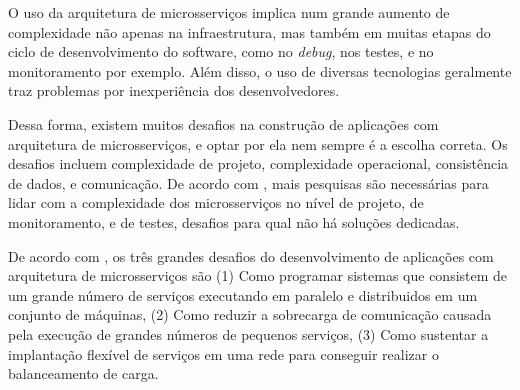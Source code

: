 O uso da arquitetura de microsserviços implica num grande aumento de complexidade não apenas na infraestrutura, mas também em muitas etapas do ciclo de desenvolvimento do software, como no \emph{debug}, nos testes, e no monitoramento por exemplo. Além disso, o uso de diversas tecnologias geralmente traz problemas por inexperiência dos desenvolvedores. 

Dessa forma, existem muitos desafios na construção de aplicações com arquitetura de microsserviços, e optar por ela nem sempre é a escolha correta. Os desafios incluem complexidade de projeto, complexidade operacional, consistência de dados, e comunicação. De acordo com , mais pesquisas são necessárias para lidar com a complexidade dos microsserviços no nível de projeto, de monitoramento, e de testes, desafios para qual não há soluções dedicadas.

De acordo com , os três grandes desafios do desenvolvimento de aplicações com arquitetura de microsserviços são (1) Como programar sistemas que consistem de um grande número de serviços executando em paralelo e distribuidos em um conjunto de máquinas, (2) Como reduzir a sobrecarga de comunicação causada pela execução de grandes números de pequenos serviços, (3) Como sustentar a implantação flexível de serviços em uma rede para conseguir realizar o balanceamento de carga.







